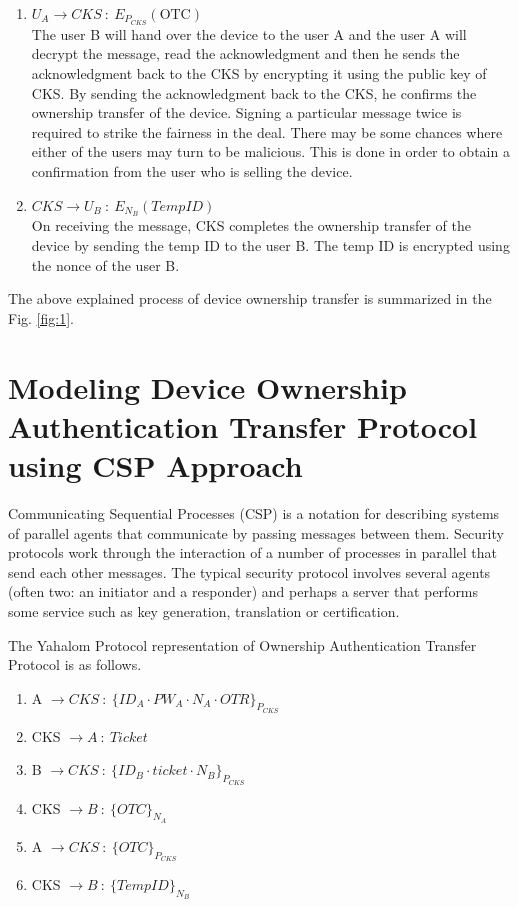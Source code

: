 \documentclass[letterpaper]{article}
\begin{document}
\begin{enumerate}
				\item $U_A \rightarrow CKS \ :\  E_{P_{CKS}}(\mbox{OTC})$\\ 
				The user B will hand over the device to the user A and the user A will decrypt the message, read the acknowledgment and then he sends the acknowledgment back to the CKS by encrypting it using the public key of CKS. By sending the acknowledgment back to the CKS, he confirms the ownership transfer of the device. Signing a particular message twice is required to strike the fairness in the deal. There may be some chances where either of the users may turn to be malicious. This is done in order to obtain a confirmation from the user who is selling the device. 
				\item $CKS \rightarrow U_B \ :\ E_{N_{B}}(TempID)$\\ 
				On receiving the message, CKS completes the ownership transfer of the device by sending the temp ID  to the user B. The temp ID is encrypted using the nonce of the user B. 
								
			\end{enumerate}
			
				The above explained process of device ownership transfer is summarized in the Fig. \ref{fig:1}.
				

\section{Modeling Device Ownership Authentication Transfer Protocol using CSP Approach}
\label{b}

Communicating Sequential Processes (CSP) \cite{masp1}\cite{masp2} is a notation for describing systems of parallel agents that communicate by passing messages between them. Security protocols work through the interaction of a number of processes in parallel that send each other messages. The typical security protocol involves several agents (often two: an initiator and a responder) and perhaps a server that performs some service such as key generation, translation or certification. 

The Yahalom Protocol \cite{yp} representation of Ownership Authentication Transfer Protocol is as follows.
\begin{enumerate}[M1]
\item A $\rightarrow CKS  \ :\  \{ID_{A} \cdot PW_A \cdot  N_{A} \cdot OTR \}_{P_{CKS}}$ 
\item CKS $\rightarrow A  \ :\   Ticket $
\item B $\rightarrow CKS  \ :\  \{ID_{B} \cdot ticket \cdot  N_{B}\}_{P_{CKS}}$ 
\item CKS $\rightarrow  B  \ :\  \{OTC\}_{N_{A}}$ 
\item A $\rightarrow CKS  \ :\  \{OTC\}_{P_{CKS}}$ 
\item CKS $\rightarrow B  \ :\  \{TempID\}_{N_{B}}$ 
\end{enumerate}
\end{document}
